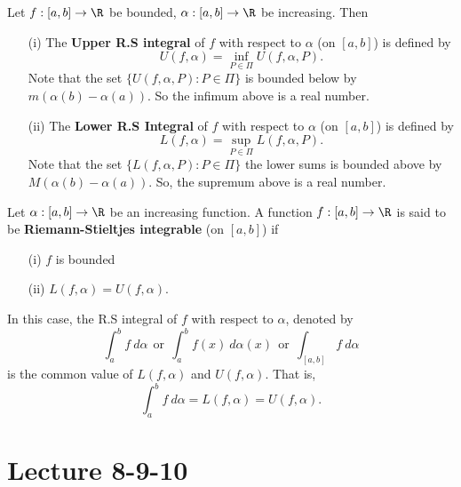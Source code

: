 \begin{definition}
    Let \( f: [a,b] \to \R  \) be bounded, \( \alpha: [a,b] \to \R  \) be increasing. Then 
    \begin{enumerate}
        \item[(i)] The \textbf{Upper R.S integral} of \( f  \) with respect to \( \alpha \) (on \( [a,b] \)) is defined by 
            \[  U(f,\alpha) = \inf_{P \in \Pi} U(f,\alpha, P).   \]
            Note that the set \( \{  U(f,\alpha, P) : P \in \Pi \}   \) is bounded below by \( m (\alpha(b) - \alpha(a)) \). So the infimum above is a real number. 
        \item[(ii)] The \textbf{Lower R.S Integral} of \( f  \) with respect to \( \alpha \) (on \( [a,b] \)) is defined by
            \[  L(f,\alpha) = \sup_{P \in \Pi} L(f,\alpha, P ). \]
            Note that the set \( \{  L(f,\alpha, P ) : P \in \Pi \} \)
            the lower sums is bounded above by \( M(\alpha(b) - \alpha(a)) \). So, the supremum above is a real number.
    \end{enumerate}
\end{definition}

\begin{definition}
    Let \( \alpha : [a,b] \to \R  \) be an increasing function. A function \( f: [a,b] \to \R  \) is said to be \textbf{Riemann-Stieltjes integrable} (on \( [a,b] \)) if 
    \begin{enumerate}
        \item[(i)] \( f \) is bounded
        \item[(ii)] \( L(f,\alpha) = U(f,\alpha) \).
    \end{enumerate}
    In this case, the R.S integral of \( f  \) with respect to \( \alpha \), denoted by
    \[ \int_{ a }^{ b }  f  \ d \alpha \ \ \text{or} \ \ \int_{ a }^{ b }  f(x)  \ d \alpha(x) \ \ \text{or} \ \ \int_{ [a,b] } f   \ d \alpha  \]
    is the common value of \( L(f,\alpha) \) and \( U(f,\alpha) \). That is, 
    \[  \int_{ a }^{ b }  f  \ d \alpha = L (f,\alpha) = U(f,\alpha). \]
\end{definition}

\section{Lecture 8-9-10}

